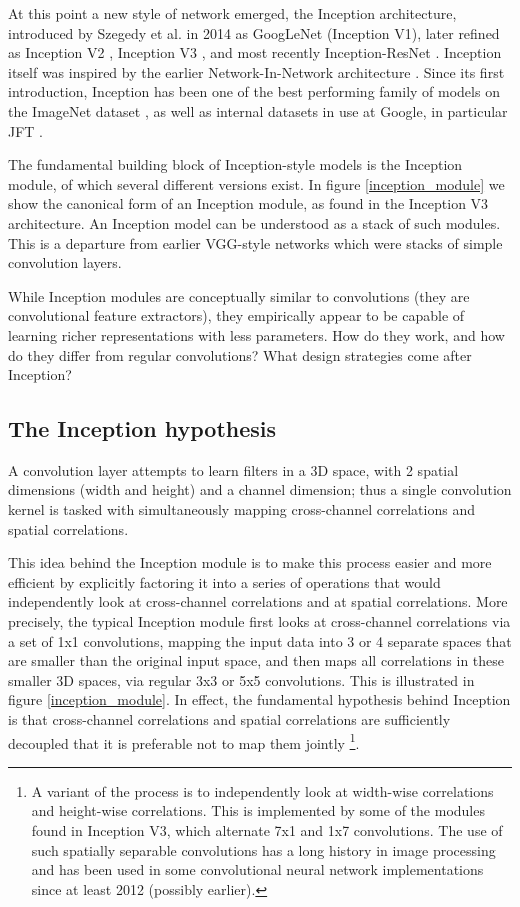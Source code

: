 \documentclass[10pt,twocolumn,letterpaper]{article}
\begin{document}
At this point a new style of network emerged, the Inception architecture, introduced by Szegedy et al. in 2014 \cite{szegedy2015going} as GoogLeNet (Inception V1), later refined as Inception V2 \cite{ioffe2015batch}, Inception V3 \cite{szegedy2015rethinking}, and most recently Inception-ResNet \cite{inceptionResnet}. Inception itself was inspired by the earlier Network-In-Network architecture \cite{lin2013network}. Since its first introduction, Inception has been one of the best performing family of models on the ImageNet dataset \cite{russakovsky2014imagenet}, as well as internal datasets in use at Google, in particular JFT \cite{hinton15}.

The fundamental building block of Inception-style models is the Inception module, of which several different versions exist. In figure \ref{inception_module} we show the canonical form of an Inception module, as found in the Inception V3 architecture.
An Inception model can be understood as a stack of such modules. This is a departure from
earlier VGG-style networks which were stacks of simple convolution layers.

While Inception modules are conceptually similar to convolutions (they are convolutional feature extractors),
they empirically appear to be capable of learning richer representations with less parameters.
How do they work, and how do they differ from regular convolutions? What design strategies come after Inception?


\subsection{The Inception hypothesis}

A convolution layer attempts to learn filters in a 3D space, with 2 spatial dimensions (width and height) and a channel dimension; thus a single convolution kernel is tasked with simultaneously mapping cross-channel correlations and spatial correlations.

This idea behind the Inception module is to make this process easier and more efficient by explicitly factoring it into a series of operations that would independently look at cross-channel correlations and at spatial correlations. More precisely, the typical Inception module first looks at cross-channel correlations via a set of 1x1 convolutions, mapping the input data into 3 or 4 separate spaces that are smaller than the original input space, and then maps all correlations in these smaller 3D spaces, via regular 3x3 or 5x5 convolutions. This is illustrated in figure \ref{inception_module}. In effect, the fundamental hypothesis behind Inception is that cross-channel correlations and spatial correlations are sufficiently decoupled that it is preferable not to map them jointly \footnote{A variant of the process is to independently look at width-wise correlations and height-wise correlations. This is implemented by some of the modules found in Inception V3, which alternate 7x1 and 1x7 convolutions. The use of such spatially separable convolutions has a long history in image processing and has been used in some convolutional neural network implementations since at least 2012 (possibly earlier).}.
\end{document}
